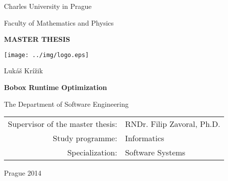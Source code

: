 \documentclass[12pt,a4paper]{report}
\begin{document}


\pagestyle{empty}
\begin{center}

\large

Charles University in Prague

\medskip

Faculty of Mathematics and Physics

\vfill

{\bf\Large MASTER THESIS}

\vfill

\centerline{\mbox{\texttt{[image: ../img/logo.eps]}}}

\vfill
\vspace{5mm}

{\LARGE Lukáš Krížik}

\vspace{15mm}

{\LARGE\bfseries Bobox Runtime Optimization}

\vfill

The Department of Software Engineering

\vfill

\begin{tabular}{rl}

Supervisor of the master thesis: & RNDr. Filip Zavoral, Ph.D. \\
\noalign{\vspace{2mm}}
Study programme: & Informatics \\
\noalign{\vspace{2mm}}
Specialization: & Software Systems \\
\end{tabular}

\vfill

Prague 2014

\end{center}

\newpage


\end{document}
